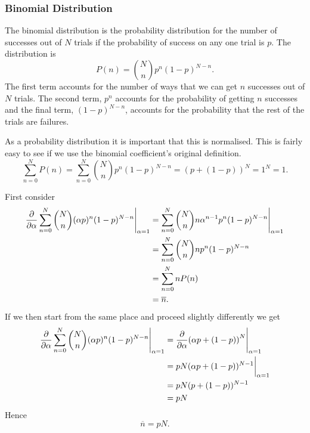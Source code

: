 \documentclass[a4paper]{article}
\newcommand{\mean}[1]{\overline{#1}}
\begin{document}
    \subsubsection{Binomial Distribution}
    The binomial distribution is the probability distribution for the number of successes out of \(N\) trials if the probability of success on any one trial is \(p\).
    The distribution is
    \[P(n) = {N\choose n}p^n(1 - p)^{N-n}.\]
    The first term accounts for the number of ways that we can get \(n\) successes out of \(N\) trials.
    The second term, \(p^n\) accounts for the probability of getting \(n\) successes and the final term, \((1 - p)^{N - n}\), accounts for the probability that the rest of the trials are failures.
    
    As a probability distribution it is important that this is normalised.
    This is fairly easy to see if we use the binomial coefficient's original definition.
    \[\sum_{n=0}^{N}P(n) = \sum_{n=0}^{N}{N\choose n}p^n(1 - p)^{N - n} = (p + (1 - p))^{N} = 1^N = 1.\]
    
    First consider
    \begin{align*}
        \pdv{\alpha}\sum_{n=0}^{N} {N\choose n}(\alpha p)^n(1 - p)^{N-n}\Bigg\vert_{\alpha = 1} &= \sum_{n=0}^{N} {N\choose n}n\alpha^{n-1} p^n(1 - p)^{N-n}\Bigg\vert_{\alpha = 1}\\
        &= \sum_{n=0}^{N} {N\choose n}n p^n(1 - p)^{N-n}\\
        &= \sum_{n=0}^{N} nP(n)\\
        &= \mean{n}.
    \end{align*}
    If we then start from the same place and proceed slightly differently we get
    \begin{align*}
        \pdv{\alpha}\sum_{n=0}^{N} {N\choose n}(\alpha p)^n(1 - p)^{N-n}\Bigg\vert_{\alpha = 1} &= \pdv{\alpha}(\alpha p + (1 - p))^N\Bigg\vert_{\alpha = 1}\\
        &= pN(\alpha p + (1 - p))^{N-1}\bigg\vert_{\alpha = 1}\\
        &= pN(p + (1 - p))^{N - 1}\\
        &= pN
    \end{align*}
    Hence
    \[\mean{n} = pN.\]
    
\end{document}
